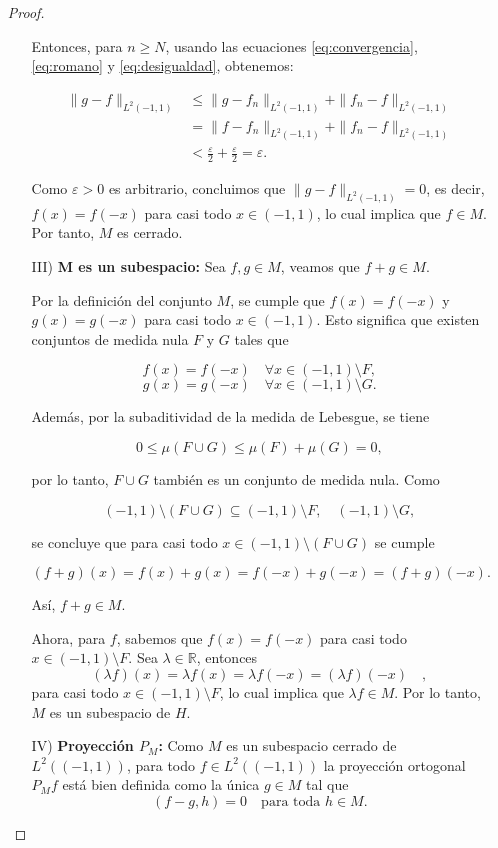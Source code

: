 \begin{itemize}
\begin{proof}
\begin{enumerate}
Entonces, para \( n \geq N \), usando las ecuaciones \eqref{eq:convergencia}, \eqref{eq:romano} y \eqref{eq:desigualdad}, obtenemos:

\begin{align*}
    \|g - f\|_{L^2(-1,1)} &\leq \|g - f_n\|_{L^2(-1,1)} + \|f_n - f\|_{L^2(-1,1)} \\
    &= \|f - f_n\|_{L^2(-1,1)} + \|f_n - f\|_{L^2(-1,1)} \\
    &< \frac{\varepsilon}{2} + \frac{\varepsilon}{2} = \varepsilon.
\end{align*}

Como \( \varepsilon > 0 \) es arbitrario, concluimos que \( \|g - f\|_{L^2(-1,1)} = 0 \), es decir, \( f(x) = f(-x) \) para casi todo \( x \in (-1,1) \), lo cual implica que \( f \in M \). Por tanto, \( M \) es cerrado.

    \item[III)] \textbf{ M es un subespacio:} Sea \( f, g \in M \), veamos que \(  f + g \in M \).

Por la definición del conjunto \( M \), se cumple que \( f(x) = f(-x) \) y \( g(x) = g(-x) \) para casi todo \( x \in (-1,1) \). Esto significa que existen conjuntos de medida nula \( F \) y \( G \) tales que

\[
f(x) = f(-x) \quad \forall x \in (-1,1) \setminus F,
\]
\[
g(x) = g(-x) \quad \forall x \in (-1,1) \setminus G.
\]

Además, por la subaditividad de la medida de Lebesgue, se tiene

\[
0 \leq \mu(F \cup G) \leq \mu(F) + \mu(G) = 0,
\]

por lo tanto, \( F \cup G \) también es un conjunto de medida nula. Como

\[
(-1,1) \setminus (F \cup G) \subseteq (-1,1) \setminus F, \quad (-1,1) \setminus G,
\]

se concluye que para casi todo \( x \in (-1,1) \setminus (F \cup G) \) se cumple

\[
(f + g)(x) = f(x) + g(x) = f(-x) + g(-x) = (f + g)(-x).
\]

Así, \( f + g \in M \).

Ahora, para \( f \), sabemos que \( f(x) = f(-x) \) para casi todo \( x \in (-1,1) \setminus F \). Sea \( \lambda \in \mathbb{R} \), entonces
\[
(\lambda f)(x) = \lambda f(x) = \lambda f(-x) = (\lambda f)(-x) \quad,
\]
para casi todo \( x \in (-1,1) \setminus F \), lo cual implica que \( \lambda f \in M \). Por lo tanto, \( M \) es un subespacio de \( H \).
\item[IV)] \textbf{Proyección $P_M$:} Como \( M \) es un subespacio cerrado de \( L^2((-1,1)) \), para todo \( f \in L^2((-1,1)) \) la proyección ortogonal \( P_M f \) está bien definida como la única \( g \in M \) tal que
\[
(f - g, h) = 0 \quad \text{para toda } h \in M.
\]


\end{enumerate}
\end{proof}
\end{itemize}
